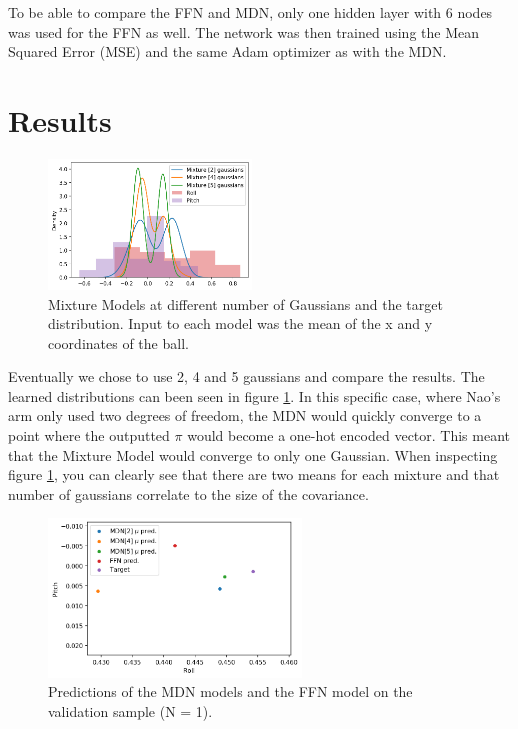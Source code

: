 \documentclass{article}
\begin{document}
    To be able to compare the FFN and MDN, only one hidden layer with 6 nodes was used for the FFN as well.
    The network was then trained using the Mean Squared Error (MSE) and the same Adam optimizer as with the MDN.


    \section{Results}\label{sec:results}
    \begin{figure}
        \begin{center}
          \includegraphics[trim=0 0 0 23pt,width=0.48\textwidth]{../part2/20kepochs_distr.png}
        \end{center}
        \caption{Mixture Models at different number of Gaussians and the target distribution. Input to each model was the mean of the x and y coordinates of the ball.}
        \label{fig:learned-mix-model}
        \vspace{15pt}
    \end{figure}

    Eventually we chose to use 2, 4 and 5 gaussians and compare the results.
    The learned distributions can been seen in figure \ref{fig:learned-mix-model}.
    In this specific case, where Nao's arm only used two degrees of freedom, the MDN would quickly converge to a point where the outputted $\pi$ would become a one-hot encoded vector. 
    This meant that the Mixture Model would converge to only one Gaussian.
    When inspecting figure \ref{fig:learned-mix-model}, you can clearly see that there are two means for each mixture and that number of gaussians correlate to the size of the covariance.


    \begin{figure}
        \vspace{-20pt}
        \begin{center}
          \includegraphics[width=0.6\textwidth]{../part2/all_mod_predictions.png}
        \end{center}
        \caption{Predictions of the MDN models and the FFN model on the validation sample (N = 1).}
        \label{fig:pred-models}
    \end{figure}
\end{document}
